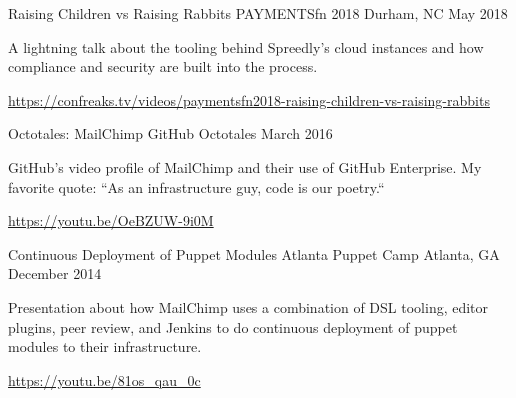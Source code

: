 

\begin{cventries}

  \cventry
    {Raising Children vs Raising Rabbits} %
    {PAYMENTSfn 2018} %
    {Durham, NC} %
    {May 2018} %
    {
      \begin{cvitems} %
        \item {A lightning talk about the tooling behind Spreedly's cloud instances and how compliance and security are built into the process.}
        \item {\url{https://confreaks.tv/videos/paymentsfn2018-raising-children-vs-raising-rabbits}}
      \end{cvitems}
    }

  \cventry
    {Octotales: MailChimp} %
    {GitHub Octotales} %
    {} %
    {March 2016} %
    {
      \begin{cvitems} %
        \item {GitHub's video profile of MailChimp and their use of GitHub Enterprise. My favorite quote: ``As an infrastructure guy, code is our poetry.``}
        \item {\url{https://youtu.be/OeBZUW-9i0M}}
      \end{cvitems}
    }

  \cventry
    {Continuous Deployment of Puppet Modules} %
    {Atlanta Puppet Camp} %
    {Atlanta, GA} %
    {December 2014} %
    {
      \begin{cvitems} %
        \item {Presentation about how MailChimp uses a combination of DSL tooling, editor plugins, peer review, and Jenkins to do continuous deployment of puppet modules to their infrastructure.}
        \item {\url{https://youtu.be/81os_qau_0c}}
      \end{cvitems}
    }

\end{cventries}
